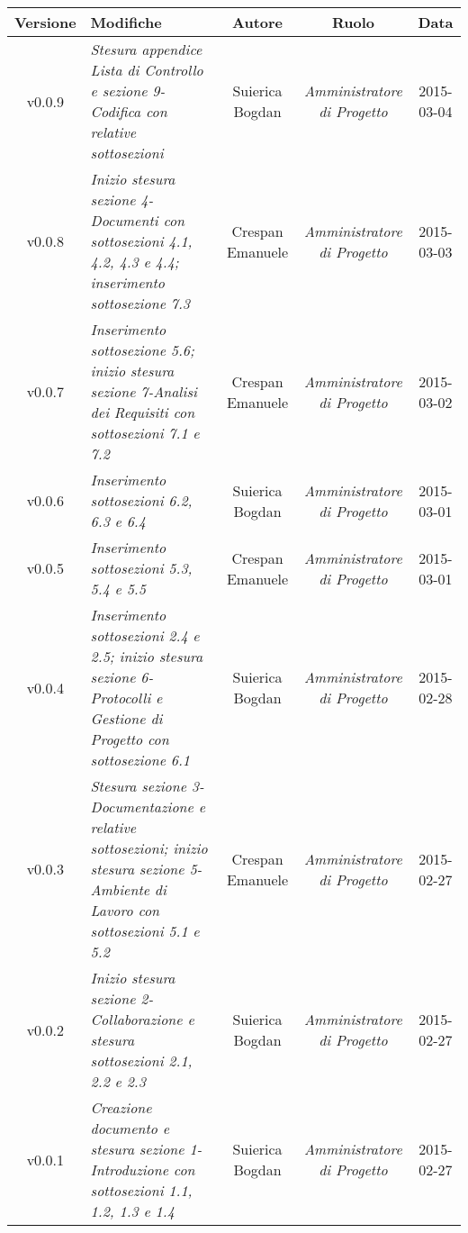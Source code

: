 \begin{table}[h]
\centering
\begin{tabular}{|c|p{}|c|c|c|}
	\toprule
		\textbf{Versione} & \textbf{Modifiche} & \textbf{Autore} & \textbf{Ruolo} & \textbf{Data} \\
	\midrule
	\midrule
		v0.0.9 & \textit{Stesura appendice Lista di Controllo e sezione 9-Codifica con relative sottosezioni} & Suierica Bogdan & \textit{Amministratore di Progetto} & 2015-03-04\\
	\midrule
		v0.0.8 & \textit{Inizio stesura sezione 4-Documenti con sottosezioni 4.1, 4.2, 4.3 e 4.4; inserimento sottosezione 7.3} & Crespan Emanuele & \textit{Amministratore di Progetto} & 2015-03-03\\
	\midrule
		v0.0.7 & \textit{Inserimento sottosezione 5.6; inizio stesura sezione 7-Analisi dei Requisiti con sottosezioni 7.1 e 7.2} & Crespan Emanuele & \textit{Amministratore di Progetto} & 2015-03-02\\
	\midrule
		v0.0.6 & \textit{Inserimento sottosezioni 6.2, 6.3 e 6.4} & Suierica Bogdan & \textit{Amministratore di Progetto} & 2015-03-01\\
	\midrule
		v0.0.5 & \textit{Inserimento sottosezioni 5.3, 5.4 e 5.5} & Crespan Emanuele & \textit{Amministratore di Progetto} & 2015-03-01\\
	\midrule
		v0.0.4 & \textit{Inserimento sottosezioni 2.4 e 2.5; inizio stesura sezione 6-Protocolli e Gestione di Progetto con sottosezione 6.1} & Suierica Bogdan & \textit{Amministratore di Progetto} & 2015-02-28\\
	\midrule
		v0.0.3 & \textit{Stesura sezione 3-Documentazione e relative sottosezioni; inizio stesura sezione 5-Ambiente di Lavoro con sottosezioni 5.1 e 5.2} & Crespan Emanuele & \textit{Amministratore di Progetto} & 2015-02-27\\
	\midrule
		v0.0.2 & \textit{Inizio stesura sezione 2-Collaborazione e stesura sottosezioni 2.1, 2.2 e 2.3} & Suierica Bogdan & \textit{Amministratore di Progetto} & 2015-02-27\\
	\midrule
		v0.0.1 & \textit{Creazione documento e stesura sezione 1-Introduzione con sottosezioni 1.1, 1.2, 1.3 e 1.4} & Suierica Bogdan & \textit{Amministratore di Progetto} & 2015-02-27\\
	\bottomrule
\end{tabular}
\end{table}
\newpage
